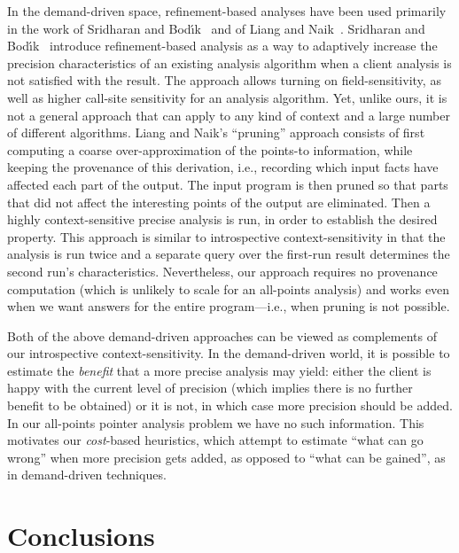 In the demand-driven space, refinement-based analyses have been used
primarily in the work of Sridharan and Bod\'{\i}k~\cite{1134027} and
of Liang and Naik~\cite{Liang:2011:SAR:1993498.1993567}.  Sridharan
and Bod\'{\i}k~\cite{1134027} introduce refinement-based analysis as a
way to adaptively increase the precision characteristics of an
existing analysis algorithm when a client analysis is not satisfied
with the result. The approach allows turning on field-sensitivity, as
well as higher call-site sensitivity for an analysis algorithm. Yet,
unlike ours, it is not a general approach that can apply to any kind
of context and a large number of different algorithms.  Liang and
Naik's ``pruning'' approach \cite{Liang:2011:SAR:1993498.1993567}
consists of first computing a coarse over-approximation of the
points-to information, while keeping the provenance of this
derivation, i.e., recording which input facts have affected each part
of the output. The input program is then pruned so that parts that did
not affect the interesting points of the output are eliminated. Then a
highly context-sensitive precise analysis is run, in order to
establish the desired property. This approach is similar to
introspective context-sensitivity in that the analysis is run twice
and a separate query over the first-run result determines the second
run's characteristics.  Nevertheless, our approach requires no
provenance computation (which is unlikely to scale for an all-points
analysis) and works even when we want answers for the entire
program---i.e., when pruning is not possible.

Both of the above demand-driven approaches can be viewed as
complements of our introspective context-sensitivity. In the
demand-driven world, it is possible to estimate the \emph{benefit}
that a more precise analysis may yield: either the client is happy
with the current level of precision (which implies there is no further
benefit to be obtained) or it is not, in which case more precision
should be added. In our all-points pointer analysis problem we have no
such information. This motivates our \emph{cost}-based heuristics,
which attempt to estimate ``what can go wrong'' when more precision
gets added, as opposed to ``what can be gained'', as in demand-driven
techniques.

\section{Conclusions}

